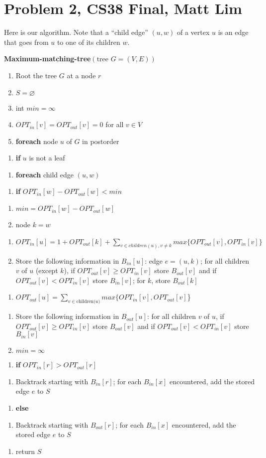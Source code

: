 \documentclass{article}
\newcommand{\modifyenum}[1]{%
  \end{enumerate}
  \begin{enumerate}[resume,#1]
}
\begin{document}
\section*{Problem 2, CS38 Final, Matt Lim}
Here is our algorithm. Note that a ``child edge'' $(u,w)$ of a vertex $u$ is an edge
that goes from $u$ to one of its children $w$.

\vspace{5mm}

\textbf{Maximum-matching-tree}$(\text{tree } G = (V,E))$
\begin{enumerate}
    \item Root the tree $G$ at a node $r$
    \item $S = \varnothing$
    \item int $min = \infty$
    \item $OPT_{in}[v] = OPT_{out}[v] = 0$ for all $v \in V$
    \item \textbf{foreach} node $u$ of $G$ in postorder
    \modifyenum{leftmargin=50pt}
    \item \textbf{if} $u$ is not a leaf
    \modifyenum{leftmargin=75pt}
    \item \textbf{foreach} child edge $(u,w)$
    \modifyenum{leftmargin=100pt}
    \item \textbf{if} $OPT_{in}[w] - OPT_{out}[w] < min$
    \modifyenum{leftmargin=125pt}
    \item $min = OPT_{in}[w] - OPT_{out}[w]$
    \item node $k = w$
    \modifyenum{leftmargin=75pt}
    \item $OPT_{in}[u] = 1 + OPT_{out}[k] + \sum_{v \in children(u), v \neq k}
    max\{OPT_{out}[v], OPT_{in}[v]\}$
    \item Store the following information in
        $B_{in}[u]$: edge $e = (u,k)$; for all children $v$ of $u$ (except $k$),
        if $OPT_{out}[v] \geq OPT_{in}[v]$ store $B_{out}[v]$ and
        if $OPT_{out}[v] < OPT_{in}[v]$ store $B_{in}[v]$; for $k$, store
        $B_{out}[k]$
    \modifyenum{leftmargin=75pt}
    \item $OPT_{out}[u] =
        \sum_{v \in \text{children($u$)}} max\{OPT_{in}[v], OPT_{out}[v]$\}
    \modifyenum{leftmargin=75pt}
    \item Store the following information in
        $B_{out}[u]$: for all children $v$ of $u$,
        if $OPT_{out}[v] \geq OPT_{in}[v]$ store $B_{out}[v]$ and
        if $OPT_{out}[v] < OPT_{in}[v]$ store $B_{in}[v]$
    \item $min = \infty$
    \modifyenum{leftmargin=25pt}
    \item \textbf{if} $OPT_{in}[r] > OPT_{out}[r]$
    \modifyenum{leftmargin=50pt}
    \item Backtrack starting with $B_{in}[r]$; for
        each $B_{in}[x]$ encountered, add the stored edge $e$ to $S$
    \modifyenum{leftmargin=25pt}
    \item \textbf{else}
    \modifyenum{leftmargin=50pt}
    \item Backtrack starting with $B_{out}[r]$; for each $B_{in}[x]$ encountered,
        add the stored edge $e$ to $S$
    \modifyenum{leftmargin=25pt}
    \item return $S$
\end{enumerate}
\end{document}

